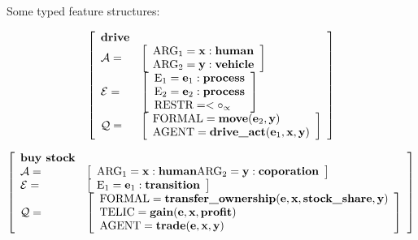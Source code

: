 Some typed feature structures:
\par\vspace{5mm}
$$\left[
\begin{array}{l l}
\textbf{drive} & \\
\mathcal{A} = & \left[ \begin{array}{l}
	\text{ARG}_1=\textbf{x}:\textbf{human} \\
	\text{ARG}_2=\textbf{y}:\textbf{vehicle} \\
	\end{array}\right] \\
\mathcal{E} = & \left[ \begin{array}{l}
	\text{E}_1=\textbf{e}_1:\textbf{process} \\
	\text{E}_2=\textbf{e}_2:\textbf{process} \\
	\text{RESTR}=<\circ_\propto
	\end{array}\right] \\
\mathcal{Q} = &  \left[ \begin{array}{l}
	\text{FORMAL}=\textbf{move}(\textbf{e}_2,\textbf{y}) \\
	\text{AGENT} = \textbf{drive\_act}(\textbf{e}_1,\textbf{x},\textbf{y}) \\
	\end{array}\right] \\
\end{array}
\right]$$
\par\vspace{5mm}
$$\left[
\begin{array}{l l}
\textbf{buy stock} & \\
\mathcal{A} = & \left[ \begin{array}{l}
	\text{ARG}_1=\textbf{x}:\textbf{human}
	\text{ARG}_2=\textbf{y}:\textbf{coporation}
	\end{array}\right] \\
\mathcal{E} = & \left[ \begin{array}{l}
	\text{E}_1=\textbf{e}_1:\textbf{transition} \\
	\end{array}\right] \\
\mathcal{Q} = &  \left[ \begin{array}{l}
	\text{FORMAL}=\textbf{transfer\_ownership}(\textbf{e},\textbf{x},\textbf{stock\_share},\textbf{y}) \\
	\text{TELIC}=\textbf{gain}(\textbf{e},\textbf{x},\textbf{profit}) \\
	\text{AGENT} = \textbf{trade}(\textbf{e},\textbf{x},\textbf{y}) \\
	\end{array}\right] \\
\end{array}
\right]$$
\par\vspace{5mm}

